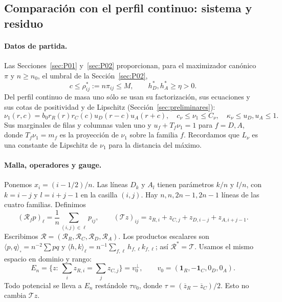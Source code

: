 \subsection{Comparación con el perfil continuo: sistema y residuo}\label{sec:P05}
\paragraph{Datos de partida.}
Las Secciones~\ref{sec:P01} y~\ref{sec:P02} proporcionan, para el maximizador canónico $\pi$ y
$n\ge n_0$, el umbral de la Sección~\ref{sec:P02},
\[
 c\le\rho^*_{ij}:=n\pi_{ij}\le M,\qquad h_D^*,h_A^*\ge\eta>0.
                                                        \tag{TR1}
\]
Del perfil continuo de masa uno sólo se usan su factorización, sus ecuaciones y
sus cotas de positividad y de Lipschitz (Sección~\ref{sec:preliminares}):
\[
 \nu_1(r,c)=b_0 r_R(r)r_C(c)u_D(r-c)u_A(r+c),\quad
 c_\nu\le\nu_1\le C_\nu,\quad \kappa_\nu\le u_D,u_A\le1.
                                                        \tag{TR2}
\]
Sus marginales de filas y columnas valen uno y $u_f+T_f\nu_1=1$ para $f=D,A$, donde $T_f\nu_1=m_f$ es
la proyección de $\nu_1$ sobre la familia $f$.
Recordamos que $L_\nu$ es una constante de Lipschitz de $\nu_1$ para la distancia del máximo.

\paragraph{Malla, operadores y gauge.}
Ponemos $x_i=(i-1/2)/n$. Las líneas $D_k$ y $A_l$ tienen parámetros
$k/n$ y $l/n$, con $k=i-j$ y $l=i+j-1$ en la casilla $(i,j)$.
Hay $n,n,2n-1,2n-1$ líneas de las cuatro familias. Definimos
\[
 (\mathcal R_f p)_\ell=\frac1n\sum_{(i,j)\in\ell}p_{ij},\qquad
 (\mathcal T z)_{ij}=z_{R,i}+z_{C,j}+z_{D,i-j}+z_{A,i+j-1}.
                                                        \tag{TR3}
\]
Escribimos $\mathcal R=(\mathcal R_R,\mathcal R_C,
\mathcal R_D,\mathcal R_A)$. Los productos escalares son
$\langle p,q\rangle_\square=n^{-2}\sum pq$ y
$\langle h,k\rangle_\ell=n^{-1}\sum_{f,\ell}h_{f,\ell}k_{f,\ell}$;
así $\mathcal R^*=\mathcal T$. Usamos el mismo espacio en dominio y rango:
\[
 E_n=\{z:\ \sum_i z_{R,i}=\sum_j z_{C,j}\}=v_0^\perp,\qquad
 v_0=(\mathbf1_R,-\mathbf1_C,0_D,0_A).
                                                        \tag{TR4}
\]
Todo potencial se lleva a $E_n$ restándole $\tau v_0$, donde
$\tau=(\overline z_R-\overline z_C)/2$. Esto no cambia $\mathcal Tz$.

